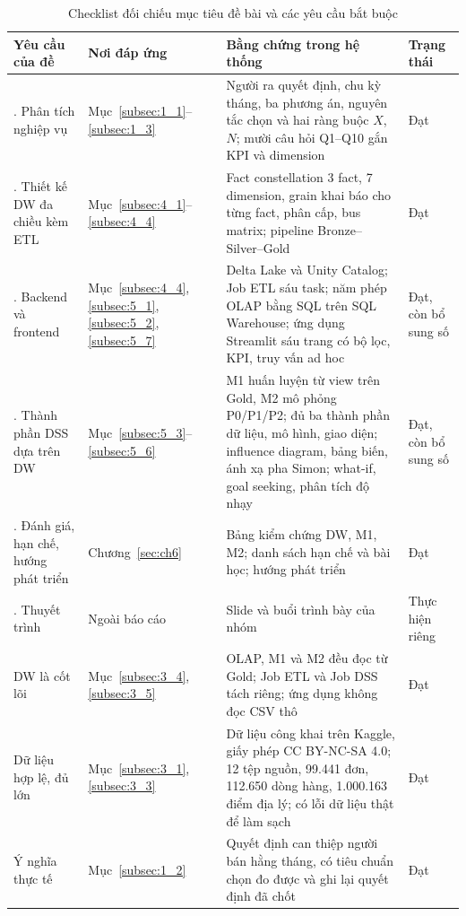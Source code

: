 \documentclass[a4paper]{article}
\begin{document}
\begin{table}[htbp]
\centering
\footnotesize
\setlength{\tabcolsep}{3pt}
\renewcommand{\arraystretch}{1.08}
\caption{Checklist đối chiếu mục tiêu đề bài và các yêu cầu bắt buộc}
\label{tab:rtm_checklist}
\begin{tabularx}{\textwidth}{@{}>{\raggedright\arraybackslash}p{3.3cm}>{\raggedright\arraybackslash}p{1.9cm}>{\raggedright\arraybackslash}X>{\raggedright\arraybackslash}p{1.9cm}@{}}
\toprule
\textbf{Yêu cầu của đề} & \textbf{Nơi đáp ứng} & \textbf{Bằng chứng trong hệ thống} & \textbf{Trạng thái} \\
\midrule
1. Phân tích nghiệp vụ & Mục~\ref{subsec:1_1}--\ref{subsec:1_3} & Người ra quyết định, chu kỳ tháng, ba phương án, nguyên tắc chọn và hai ràng buộc $X$, $N$; mười câu hỏi Q1--Q10 gắn KPI và dimension & Đạt \\
\addlinespace
2. Thiết kế DW đa chiều kèm ETL & Mục~\ref{subsec:4_1}--\ref{subsec:4_4} & Fact constellation 3 fact, 7 dimension, grain khai báo cho từng fact, phân cấp, bus matrix; pipeline Bronze--Silver--Gold & Đạt \\
\addlinespace
3. Backend và frontend & Mục~\ref{subsec:4_4}, \ref{subsec:5_1}, \ref{subsec:5_2}, \ref{subsec:5_7} & Delta Lake và Unity Catalog; Job ETL sáu task; năm phép OLAP bằng SQL trên SQL Warehouse; ứng dụng Streamlit sáu trang có bộ lọc, KPI, truy vấn ad hoc & Đạt, còn bổ sung số \\
\addlinespace
4. Thành phần DSS dựa trên DW & Mục~\ref{subsec:5_3}--\ref{subsec:5_6} & M1 huấn luyện từ view trên Gold, M2 mô phỏng P0/P1/P2; đủ ba thành phần dữ liệu, mô hình, giao diện; influence diagram, bảng biến, ánh xạ pha Simon; what-if, goal seeking, phân tích độ nhạy & Đạt, còn bổ sung số \\
\addlinespace
5. Đánh giá, hạn chế, hướng phát triển & Chương~\ref{sec:ch6} & Bảng kiểm chứng DW, M1, M2; danh sách hạn chế và bài học; hướng phát triển & Đạt \\
\addlinespace
6. Thuyết trình & Ngoài báo cáo & Slide và buổi trình bày của nhóm & Thực hiện riêng \\
\midrule
DW là cốt lõi & Mục~\ref{subsec:3_4}, \ref{subsec:3_5} & OLAP, M1 và M2 đều đọc từ Gold; Job ETL và Job DSS tách riêng; ứng dụng không đọc CSV thô & Đạt \\
\addlinespace
Dữ liệu hợp lệ, đủ lớn & Mục~\ref{subsec:3_1}, \ref{subsec:3_3} & Dữ liệu công khai trên Kaggle, giấy phép CC BY-NC-SA 4.0; 12 tệp nguồn, 99.441 đơn, 112.650 dòng hàng, 1.000.163 điểm địa lý; có lỗi dữ liệu thật để làm sạch & Đạt \\
\addlinespace
Ý nghĩa thực tế & Mục~\ref{subsec:1_2} & Quyết định can thiệp người bán hằng tháng, có tiêu chuẩn chọn đo được và ghi lại quyết định đã chốt & Đạt \\
\bottomrule
\end{tabularx}
\end{table}
\end{document}
